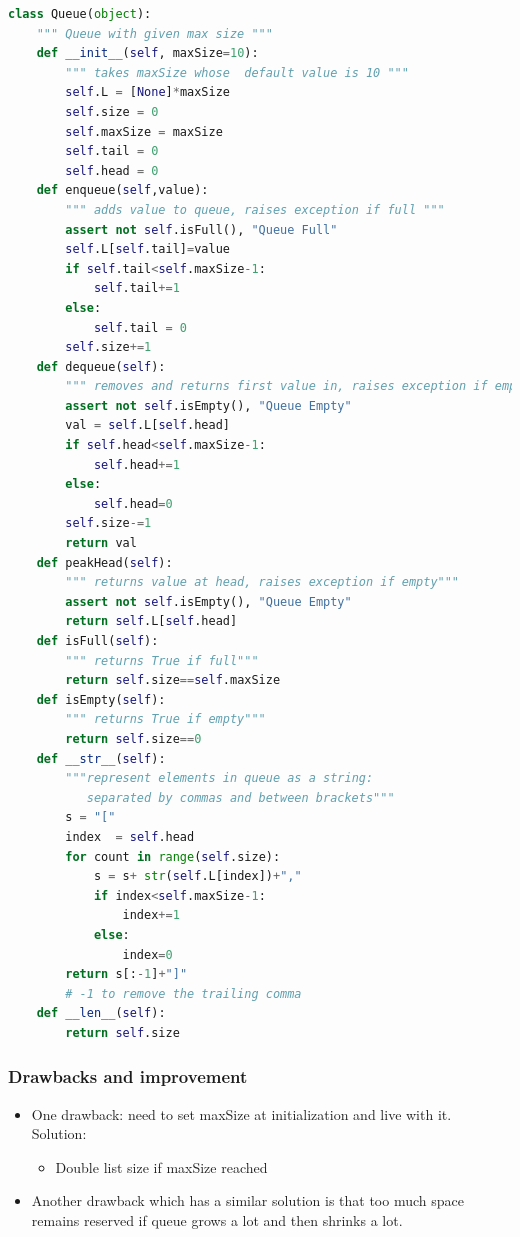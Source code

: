 \documentclass[12pt,oneside]{book}
\begin{document}
\pagebreak
{\small\begin{lstlisting}[language=python]
class Queue(object):
    """ Queue with given max size """ 
    def __init__(self, maxSize=10):
        """ takes maxSize whose  default value is 10 """
        self.L = [None]*maxSize
        self.size = 0
        self.maxSize = maxSize
        self.tail = 0
        self.head = 0
    def enqueue(self,value):
        """ adds value to queue, raises exception if full """ 
        assert not self.isFull(), "Queue Full"
        self.L[self.tail]=value
        if self.tail<self.maxSize-1:
            self.tail+=1
        else: 
            self.tail = 0
        self.size+=1
    def dequeue(self):
        """ removes and returns first value in, raises exception if empty"""
        assert not self.isEmpty(), "Queue Empty"         
        val = self.L[self.head]
        if self.head<self.maxSize-1:
            self.head+=1
        else: 
            self.head=0
        self.size-=1         
        return val 
    def peakHead(self):
        """ returns value at head, raises exception if empty"""
        assert not self.isEmpty(), "Queue Empty"   
        return self.L[self.head] 
    def isFull(self):
        """ returns True if full"""
        return self.size==self.maxSize 
    def isEmpty(self):
        """ returns True if empty"""        
        return self.size==0
    def __str__(self):
        """represent elements in queue as a string:
           separated by commas and between brackets"""
        s = "["
        index  = self.head 
        for count in range(self.size): 
            s = s+ str(self.L[index])+","
            if index<self.maxSize-1:
                index+=1
            else: 
                index=0
        return s[:-1]+"]"
        # -1 to remove the trailing comma 
    def __len__(self):
        return self.size 
\end{lstlisting}}
\subsubsection{Drawbacks and improvement}
\begin{itemize}
	\item One drawback: need to set maxSize at initialization and live with it. \\
	      Solution: 
	      \begin{itemize}
		      \item Double list size if maxSize reached
	      \end{itemize}
	\item Another drawback which has a similar solution is that too much space remains reserved if queue grows a lot and then shrinks a lot.
\end{itemize}
\end{document}
